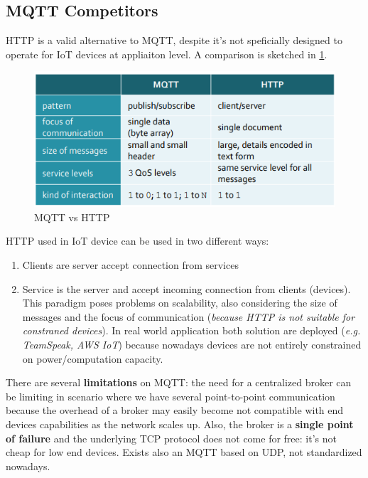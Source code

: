 \documentclass[10pt,a4paper]{report}
\theoremstyle{definition}
\begin{document}
\subsection{MQTT Competitors}\label{sec:mqtt-competitors}
HTTP is a valid alternative to MQTT, despite it's not speficially designed to operate for IoT devices at appliaiton level. A comparison is sketched in \ref{mqtt-vs-http}.
\begin{figure}[h!]
	\centering\includegraphics[scale=0.70]{images/Pasted image 20230307112648.png}
	\caption{MQTT vs HTTP}\label{mqtt-vs-http}\end{figure}

HTTP used in IoT device can be used in two different ways:
\begin{enumerate}
	\item 
	Clients are server accept connection from services
	\item 
	Service is the server and accept incoming connection from clients (devices). 	This paradigm poses problems on scalability, also considering the size of messages and the focus of communication (\textit{because HTTP is not suitable for constraned devices}).
	In real world application both solution are deployed (\textit{e.g. TeamSpeak, AWS IoT}) because nowadays devices are not entirely constrained on power/computation capacity.
\end{enumerate}

There are several \textbf{limitations} on MQTT: the need for a centralized broker can be limiting in scenario where we have several point-to-point communication because the overhead of a broker may easily become not compatible with end devices capabilities as the network scales up. Also, the broker is a \textbf{single point of failure} and the underlying TCP protocol does not come for free: it's not cheap for low end devices. Exists also an MQTT based on UDP, not standardized nowadays.
\end{document}
